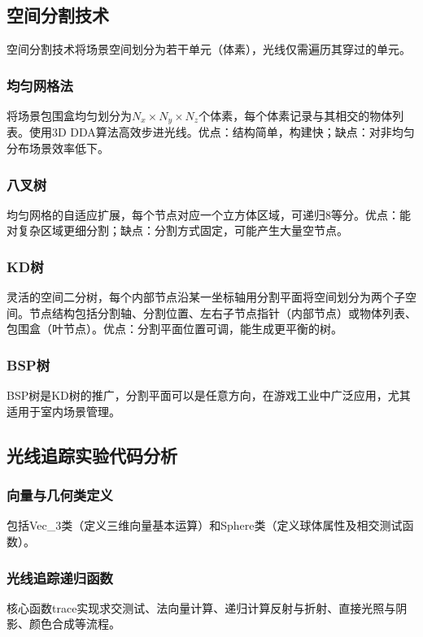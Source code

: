 \documentclass[12pt]{article}
\begin{document}
\subsection{空间分割技术}

空间分割技术将场景空间划分为若干单元（体素），光线仅需遍历其穿过的单元。

\subsubsection{均匀网格法}
将场景包围盒均匀划分为$N_x \times N_y \times N_z$个体素，每个体素记录与其相交的物体列表。使用3D DDA算法高效步进光线。优点：结构简单，构建快；缺点：对非均匀分布场景效率低下。

\subsubsection{八叉树}
均匀网格的自适应扩展，每个节点对应一个立方体区域，可递归8等分。优点：能对复杂区域更细分割；缺点：分割方式固定，可能产生大量空节点。

\subsubsection{KD树}
灵活的空间二分树，每个内部节点沿某一坐标轴用分割平面将空间划分为两个子空间。节点结构包括分割轴、分割位置、左右子节点指针（内部节点）或物体列表、包围盒（叶节点）。优点：分割平面位置可调，能生成更平衡的树。

\subsubsection{BSP树}
BSP树是KD树的推广，分割平面可以是任意方向，在游戏工业中广泛应用，尤其适用于室内场景管理。

\subsection{光线追踪实验代码分析}

\subsubsection{向量与几何类定义}
包括Vec\_3类（定义三维向量基本运算）和Sphere类（定义球体属性及相交测试函数）。

\subsubsection{光线追踪递归函数}
核心函数trace实现求交测试、法向量计算、递归计算反射与折射、直接光照与阴影、颜色合成等流程。
\end{document}
